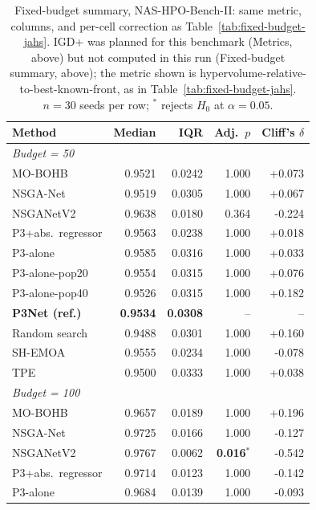 \begin{table}[t]
    \centering
    \footnotesize
    \caption{Fixed-budget summary, NAS-HPO-Bench-II: same metric, columns, and per-cell correction as
    Table~\ref{tab:fixed-budget-jahs}. IGD+ was planned for this benchmark (Metrics, above) but not
    computed in this run (Fixed-budget summary, above); the metric shown is
    hypervolume-relative-to-best-known-front, as in Table~\ref{tab:fixed-budget-jahs}. $n=30$ seeds per row;
    $^{*}$ rejects $H_0$ at $\alpha=0.05$.}
    \label{tab:fixed-budget-nashpo}
    \begin{tabular}{@{}lrrrr@{}}
        \toprule
        \textbf{Method} & \textbf{Median} & \textbf{IQR} & \textbf{Adj.\ $p$} & \textbf{Cliff's $\delta$} \\
        \midrule
        \multicolumn{5}{l}{\emph{Budget = 50}} \\
        MO-BOHB & 0.9521 & 0.0242 & 1.000 & +0.073 \\
        NSGA-Net & 0.9519 & 0.0305 & 1.000 & +0.067 \\
        NSGANetV2 & 0.9638 & 0.0180 & 0.364 & -0.224 \\
        P3+abs.\ regressor & 0.9563 & 0.0238 & 1.000 & +0.018 \\
        P3-alone & 0.9585 & 0.0316 & 1.000 & +0.033 \\
        P3-alone-pop20 & 0.9554 & 0.0315 & 1.000 & +0.076 \\
        P3-alone-pop40 & 0.9526 & 0.0315 & 1.000 & +0.182 \\
        \textbf{P3Net (ref.)} & \textbf{0.9534} & \textbf{0.0308} & -- & -- \\
        Random search & 0.9488 & 0.0301 & 1.000 & +0.160 \\
        SH-EMOA & 0.9555 & 0.0234 & 1.000 & -0.078 \\
        TPE & 0.9500 & 0.0333 & 1.000 & +0.038 \\
        \midrule
        \multicolumn{5}{l}{\emph{Budget = 100}} \\
        MO-BOHB & 0.9657 & 0.0189 & 1.000 & +0.196 \\
        NSGA-Net & 0.9725 & 0.0166 & 1.000 & -0.127 \\
        NSGANetV2 & 0.9767 & 0.0062 & \textbf{0.016$^{*}$} & -0.542 \\
        P3+abs.\ regressor & 0.9714 & 0.0123 & 1.000 & -0.142 \\
        P3-alone & 0.9684 & 0.0139 & 1.000 & -0.093 \\

\end{tabular}
\end{table}
